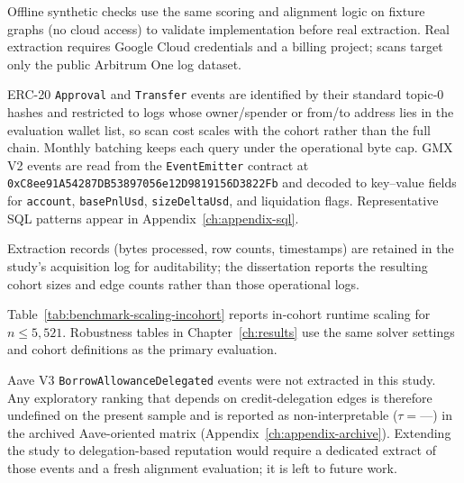 Offline synthetic checks use the same scoring and alignment logic on fixture graphs (no cloud access) to validate implementation before real extraction. Real extraction requires Google Cloud credentials and a billing project; scans target only the public Arbitrum One log dataset.


ERC-20 \texttt{Approval} and \texttt{Transfer} events are identified by their standard topic-$0$ hashes and restricted to logs whose owner/spender or from/to address lies in the evaluation wallet list, so scan cost scales with the cohort rather than the full chain. Monthly batching keeps each query under the operational byte cap. GMX V2 events are read from the \texttt{EventEmitter} contract at
\texttt{0xC8ee91A54287DB53897056e12D9819156D3822Fb}
and decoded to key--value fields for \texttt{account}, \texttt{basePnlUsd}, \texttt{sizeDeltaUsd}, and liquidation flags. Representative SQL patterns appear in Appendix~\ref{ch:appendix-sql}.

Extraction records (bytes processed, row counts, timestamps) are retained in the study's acquisition log for auditability; the dissertation reports the resulting cohort sizes and edge counts rather than those operational logs.


Table~\ref{tab:benchmark-scaling-incohort} reports in-cohort runtime scaling for $n \leq 5{,}521$. Robustness tables in Chapter~\ref{ch:results} use the same solver settings and cohort definitions as the primary evaluation.




Aave V3 \texttt{BorrowAllowanceDelegated} events were not extracted in this study. Any exploratory ranking that depends on credit-delegation edges is therefore undefined on the present sample and is reported as non-interpretable ($\tau = \text{---}$) in the archived Aave-oriented matrix (Appendix~\ref{ch:appendix-archive}). Extending the study to delegation-based reputation would require a dedicated extract of those events and a fresh alignment evaluation; it is left to future work.


